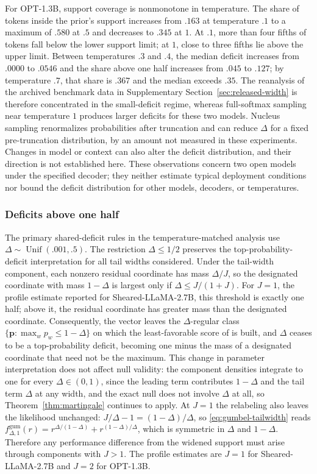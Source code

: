 \documentclass[11pt]{article}
\newcommand{\bP}{\bm p}
\newcommand{\Unif}{\operatorname{Unif}}
\begin{document}
For OPT-1.3B, support coverage is nonmonotone in temperature.  The share of tokens inside the
prior's support increases from $.163$ at temperature $.1$ to a maximum of $.580$
at $.5$ and decreases to $.345$ at $1$.  At $.1$, more than four fifths of tokens
fall below the lower support limit; at $1$, close to three fifths lie above the
upper limit.  Between temperatures $.3$ and $.4$, the median deficit increases
from $.0000$ to $.0546$ and the share above one half increases from $.045$ to
$.127$; by temperature $.7$, that share is $.367$ and the median exceeds $.35$.
The reanalysis of the archived benchmark data in Supplementary Section~\ref{sec:released-width} is therefore
concentrated in the small-deficit regime, whereas full-softmax sampling near
temperature $1$ produces larger deficits for these two models.  Nucleus sampling
renormalizes probabilities after truncation and can reduce $\Delta$ for a fixed
pre-truncation distribution, by an amount not measured in these experiments.
Changes in model or context can also alter the deficit distribution, and their
direction is not established here.  These observations concern two open models
under the specified decoder; they neither estimate typical deployment conditions
nor bound the deficit distribution for other models, decoders, or temperatures.

\FloatBarrier
\subsubsection{Deficits above one half}
\label{sec:deficit-support}

The primary shared-deficit rules in the temperature-matched analysis use
$\Delta\sim\Unif(.001,.5)$.  The restriction $\Delta\le1/2$ preserves the
top-probability-deficit interpretation for all tail widths considered.
Under the tail-width component, each nonzero residual coordinate has mass
$\Delta/J$, so the designated coordinate with mass $1-\Delta$ is largest only if
$\Delta\le J/(1+J)$.  For $J=1$, the profile estimate reported for
Sheared-LLaMA-2.7B, this threshold is exactly one half; above it, the residual
coordinate has greater mass than the designated coordinate.  Consequently, the vector leaves the $\Delta$-regular class
$\{\bP:\max_w p_w\le1-\Delta\}$ on which the least-favorable score of
\citet{li2025framework} is built, and $\Delta$ ceases to be a top-probability
deficit, becoming one minus the mass of a designated coordinate that need not be
the maximum.  This change in parameter interpretation does not affect null
validity: the component densities integrate to one
for every $\Delta\in(0,1)$, since the leading term contributes $1-\Delta$ and the
tail term $\Delta$ at any width, and the exact null does not involve $\Delta$ at
all, so Theorem~\ref{thm:martingale} continues to apply.  At $J=1$ the relabeling
also leaves the likelihood unchanged: $J/\Delta-1=(1-\Delta)/\Delta$, so
\eqref{eq:gumbel-tailwidth} reads
$f^{\mathrm{gum}}_{\Delta,1}(r)=r^{\Delta/(1-\Delta)}+r^{(1-\Delta)/\Delta}$, which
is symmetric in $\Delta$ and $1-\Delta$.  Therefore any performance difference
from the widened support must arise through components with $J>1$.  The profile
estimates are $J=1$ for Sheared-LLaMA-2.7B and $J=2$ for OPT-1.3B.
\end{document}
